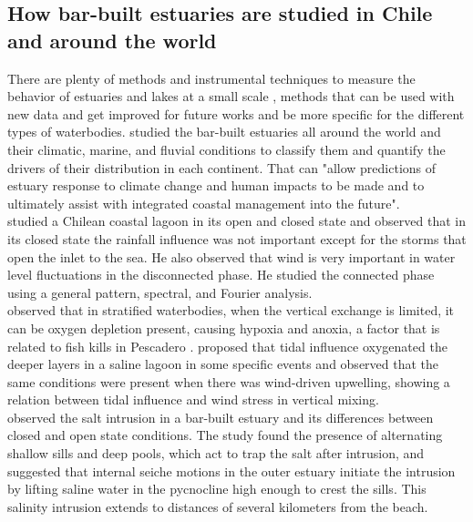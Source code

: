 \documentclass[tesis.tex]{subfiles}
\begin{document}
\subsection{How bar-built estuaries are studied in Chile and around the world}

There are plenty of methods and instrumental techniques to measure the behavior of estuaries and lakes at a small scale \citep{Wuest2003}, methods that can be used with new data and get improved for future works and be more specific for the different types of waterbodies. \cite{mcsweeney2017intermittently} studied the bar-built estuaries all around the world and their climatic, marine, and fluvial conditions to classify them and quantify the drivers of their distribution in each continent. That can "allow predictions of estuary response to climate change and human impacts to be made and to ultimately assist with integrated coastal management into the future".\\

\cite{dussaillant2009} studied a Chilean coastal lagoon in its open and closed state and observed that in its closed state the rainfall influence was not important except for the storms that open the inlet to the sea. He also observed that wind is very important in water level fluctuations in the disconnected phase. He studied the connected phase using a general pattern, spectral, and Fourier analysis.\\

\cite{Kelly2018} observed that in stratified waterbodies, when the vertical exchange is limited, it can be oxygen depletion present, causing hypoxia and anoxia, a factor that is related to fish kills in Pescadero \citep{largier2015}. \cite{Kelly2018} proposed that tidal influence oxygenated the deeper layers in a saline lagoon in some specific events and observed that the same conditions were present when there was wind-driven upwelling, showing a relation between tidal influence and wind stress in vertical mixing.\\

\cite{Behrens2016} observed the salt intrusion in a bar-built estuary and its differences between closed and open state conditions. The study found the presence of alternating shallow sills and deep pools, which act to trap the salt after intrusion, and suggested that internal seiche motions in the outer estuary initiate the intrusion by lifting saline water in the pycnocline high enough to crest the sills. This salinity intrusion extends to distances of several kilometers from the beach.\\
\end{document}
